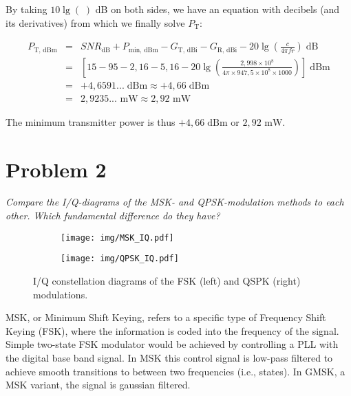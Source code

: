 \documentclass[a4paper, 12pt]{article}
\begin{document}
\noindent By taking $10 \lg \left( \; \right)$ dB on both sides, we have an equation with 
decibels (and its derivatives) from which we finally solve $P_\mathrm{T}$:

\begin{eqnarray}
P_\mathrm{T,\,dBm} & = & SNR_\mathrm{dB} + P_\mathrm{min,\,dBm} - G_\mathrm{T,\,dBi} - G_\mathrm{R,\,dBi} - 20 \lg \left(\frac{c}{4 \pi f r}\right) \mathrm{\;dB}\\[2pt]
& = & \left[ 15 - 95 - 2,\!16 - 5,\!16 - 20 \lg \left(\frac{2,\!998 \times 10^8}{4 \pi \times 947,\!5 \times 10^8 \times 1000}\right) \right] \mathrm{\;dBm}\\[2pt]
& = & +4,\!6591... \mathrm{\;dBm} \approx +4,\!66 \mathrm{\;dBm} \\[2pt]
& = & 2,\!9235... \textrm{ mW} \approx 2,\!92 \textrm{ mW}
\end{eqnarray}

\noindent The minimum transmitter power is thus $+4,\!66 \mathrm{\;dBm}$ or $2,\!92 \textrm{ mW}$.


\section*{Problem 2}

\textit{Compare the I/Q-diagrams of the MSK- and QPSK-modulation methods to each other. 
Which fundamental difference do they have?}

\begin{figure}[!h]
	\begin{center}
	\begin{subfigure}[c]{0.3\textwidth}
		\texttt{[image: img/MSK\_IQ.pdf]}
	\end{subfigure}
	\begin{subfigure}[c]{0.3\textwidth}
		\texttt{[image: img/QPSK\_IQ.pdf]}
	\end{subfigure}
	\caption{I/Q constellation diagrams of the FSK (left) and QSPK (right) modulations. \cite{parts}}
	\end{center}
\end{figure}
		
		
		
MSK, or Minimum Shift Keying, refers to a specific type of Frequency Shift Keying (FSK), where the 
information is coded into the frequency of the signal. Simple two-state FSK modulator would be 
achieved by controlling a PLL with the digital base band signal. In MSK this control signal is 
low-pass filtered to achieve smooth transitions to between two frequencies (i.e., states). In 
GMSK, a MSK variant, the signal is gaussian filtered.
\end{document}
